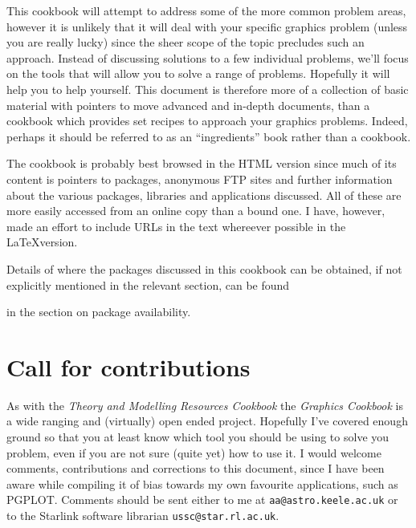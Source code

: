 \documentclass[twoside,11pt]{article}
\newcommand{\htmladdnormallink}[2]{#1}
\newcommand{\htmlref}[2]{#1}
\newcommand{\xref}[3]{#1}
\newcommand{\xlabel}[1]{}
\begin{document}
This cookbook will attempt to address some of the more common problem areas, however it is unlikely that it will deal with your specific graphics problem (unless you are really lucky) since the sheer scope of the topic precludes such an approach. Instead of discussing solutions to a few individual problems, we'll focus on the tools that will allow you to solve a range of problems. Hopefully it will help you to help yourself. This document is therefore more of a collection of basic material with pointers to move advanced and in-depth documents, than a cookbook which provides set recipes to approach your graphics problems. Indeed, perhaps it should be referred to as an ``ingredients'' book rather than a cookbook. 

The cookbook is probably best browsed in the HTML version since much of its content is pointers to packages, anonymous FTP sites and further information about the various packages, libraries and applications discussed. All of these are more easily accessed from an online copy than a bound one. I have, however, made an effort to include URLs in the text whereever possible in the \LaTeX version.

Details of where the packages discussed in this cookbook can be obtained, if not explicitly mentioned in the relevant section, can be found 
\begin{htmlonly}
in the section on \htmlref{package availability}{sc15_available}.
\end{htmlonly}

\section{\xlabel{sc15_call}Call for contributions\label{sc15_call}}

As with the \xref{{\em Theory and Modelling Resources Cookbook}}{sc13}{} the {\em Graphics Cookbook} is a wide ranging and (virtually) open ended project. Hopefully I've covered enough ground so that you at least know which tool you should be using to solve you problem, even if you are not sure (quite yet) how to use it. I would welcome comments, contributions and corrections to this document, since I have been aware while compiling it of bias towards my own favourite applications, such as PGPLOT. Comments should be sent either to me at \htmladdnormallink{{\tt aa@astro.keele.ac.uk}}{mailto:aa@astro.keele.ac.uk} or to the Starlink software librarian \htmladdnormallink{{\tt ussc@star.rl.ac.uk}}{mailto:ussc@star.rl.ac.uk}. 
\end{document}
